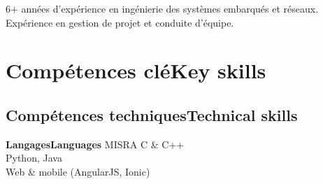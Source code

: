 \vspace{-1.3cm}

\ifnativelang
\newcommand{\CVheader}{6+ ann\'ees d'exp\'erience en ing\'enierie des syst\`emes embarqu\'es et r\'eseaux.\\%
Exp\'erience en gestion de projet et conduite d'\'equipe.}
\else
\newcommand{\CVheader}{6+ years of experience in Real-Time systems, embedded linux and networking.\\
Experience in project steering and team management.}
\fi

\begin{center}
\textcolor{color1}{\Large{\CVheader}}
\end{center}

\section{\ifnativelang Comp\'etences cl\'e\else Key skills\fi}
\subsection{\ifnativelang Comp\'etences techniques\else Technical skills\fi}

{\ifnativelang\textbf{Langages}\else \textbf{Languages}\fi}{
 MISRA C \& C++\\
 Python, Java \\
 Web \& mobile (AngularJS, Ionic)
}

\vspace{\ItemsSpacing}

